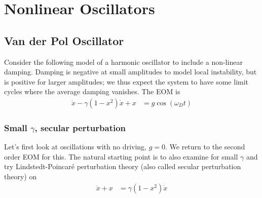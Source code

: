 \documentclass[10pt]{article}
\begin{document}
\clearpage

\section{Nonlinear Oscillators}

\subsection{Van der Pol Oscillator}

Consider the following model of a harmonic oscillator to include a non-linear
damping. Damping is negative at small amplitudes to model local instability,
but is positive for larger amplitudes; we thus expect the system to have some
limit cycles where the average damping vanishes. The EOM is
\begin{align}
    \ddot{x} - \gamma(1-x^2)\dot{x} + x &= g\cos(\omega_D t)
\end{align}

\subsubsection{Small $\gamma$, secular perturbation}

Let's first look at oscillations with no driving, $g=0$. We return to the
second order EOM for this. The natural starting point is to also examine for
small $\gamma$ and try Lindstedt-Poincar\'e perturbation theory (also called
secular perturbation theory) on
\begin{align}
    \ddot{x} + x &= \gamma(1-x^2)\dot{x}
\end{align}
\end{document}
